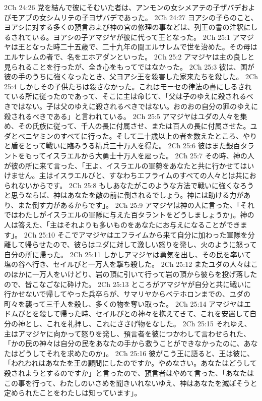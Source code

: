 2Ch 24:26  党を結んで彼にそむいた者は、アンモンの女シメアテの子ザバデおよびモアブの女シムリテの子ヨザバデであった。
2Ch 24:27  ヨアシの子らのこと、ヨアシに対する多くの預言および神の宮の修理の事などは、列王の書の注釈にしるされている。ヨアシの子アマジヤが彼に代って王となった。
2Ch 25:1  アマジヤは王となった時二十五歳で、二十九年の間エルサレムで世を治めた。その母はエルサレムの者で、名をエホアダンといった。
2Ch 25:2  アマジヤは主の良しと見られることを行ったが、全き心をもってではなかった。
2Ch 25:3  彼は、国が彼の手のうちに強くなったとき、父ヨアシ王を殺害した家来たちを殺した。
2Ch 25:4  しかしその子供たちは殺さなかった。これはモーセの律法の書にしるされている所に従ったのであって、そこに主は命じて、「父は子のゆえに殺されるべきではない。子は父のゆえに殺されるべきではない。おのおの自分の罪のゆえに殺されるべきである」と言われている。
2Ch 25:5  アマジヤはユダの人々を集め、その氏族に従って、千人の長に付属させ、または百人の長に付属させた。ユダとベニヤミンのすべてに行った。そして二十歳以上の者を数えたところ、やりと盾をとって戦いに臨みうる精兵三十万人を得た。
2Ch 25:6  彼はまた銀百タラントをもってイスラエルから大勇士十万人を雇った。
2Ch 25:7  その時、神の人が彼の所に来て言った、「王よ、イスラエルの軍勢をあなたと共に行かせてはいけません。主はイスラエルびと、すなわちエフライムのすべての人々とは共におられないからです。
2Ch 25:8  もしあなたがこのような方法で戦いに強くなろうと思うならば、神はあなたを敵の前に倒されるでしょう。神には助ける力があり、また倒す力があるからです」。
2Ch 25:9  アマジヤは神の人に言った、「それではわたしがイスラエルの軍隊に与えた百タラントをどうしましょうか」。神の人は答えた、「主はそれよりも多いものをあなたにお与えになることができます」。
2Ch 25:10  そこでアマジヤはエフライムから来て自分に加わった軍隊を分離して帰らせたので、彼らはユダに対して激しい怒りを発し、火のように怒って自分の所に帰った。
2Ch 25:11  しかしアマジヤは勇気を出し、その民を率いて塩の谷へ行き、セイルびと一万人を撃ち殺した。
2Ch 25:12  またユダの人々はこのほかに一万人をいけどり、岩の頂に引いて行って岩の頂から彼らを投げ落したので、皆こなごなに砕けた。
2Ch 25:13  ところがアマジヤが自分と共に戦いに行かせないで帰してやった兵卒らが、サマリヤからベテホロンまでの、ユダの町々を襲って三千人を殺し、多くの物を奪い取った。
2Ch 25:14  アマジヤはエドムびとを殺して帰った時、セイルびとの神々を携えてきて、これを安置して自分の神とし、これを礼拝し、これにささげ物をなした。
2Ch 25:15  それゆえ、主はアマジヤに向かって怒りを発し、預言者を彼につかわして言わせられた、「かの民の神々は自分の民をあなたの手から救うことができなかったのに、あなたはどうしてそれを求めたのか」。
2Ch 25:16  彼がこう王に語ると、王は彼に、「われわれはあなたを王の顧問にしたのですか。やめなさい。あなたはどうして殺されようとするのですか」と言ったので、預言者はやめて言った、「あなたはこの事を行って、わたしのいさめを聞きいれないゆえ、神はあなたを滅ぼそうと定められたことをわたしは知っています」。
